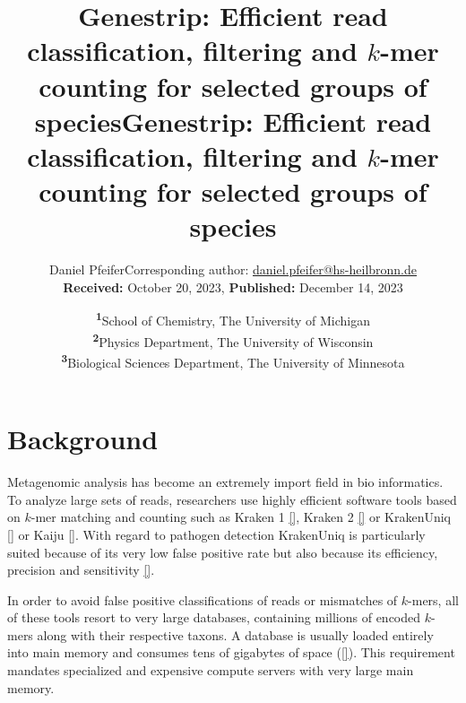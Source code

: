\documentclass[
	a4paper, %
	10pt, %
	unnumberedsections, %
	twoside, %
]{LTJournalArticle}
\title{Genestrip: Efficient read classification, filtering and $k$-mer counting for selected groups of species} %
\author{%
	Daniel Pfeifer{Corresponding author: \href{mailto:daniel.pfeifer@hs-heilbronn.de}{daniel.pfeifer@hs-heilbronn.de}\\ \textbf{Received:} October 20, 2023, \textbf{Published:} December 14, 2023}
}
\date{\footnotesize\textsuperscript{\textbf{1}}School of Chemistry, The University of Michigan\\ \textsuperscript{\textbf{2}}Physics Department, The University of Wisconsin\\ \textsuperscript{\textbf{3}}Biological Sciences Department, The University of Minnesota}
\begin{document}
\title[]{Genestrip: Efficient read classification, filtering and $k$-mer counting for selected groups of species}


\author*[1]{ }


\abstract{}




\maketitle

\section{Background}\label{background}

Metagenomic analysis has become an extremely import field in bio informatics. To analyze large sets of reads, researchers use highly efficient software tools based on $k$-mer matching and counting such as Kraken 1 \ref{}, Kraken 2 \ref{} or KrakenUniq \ref{} or Kaiju \ref{}. With regard to pathogen detection KrakenUniq is particularly suited because of its very low false positive rate but also because its efficiency, precision and sensitivity \ref{}.

In order to avoid false positive classifications of reads or mismatches of $k$-mers, all of these tools resort to very large databases, containing millions of encoded $k$-mers along with their respective taxons. A database is usually loaded entirely into main memory and consumes tens of gigabytes of space (\ref{}). This requirement mandates specialized and expensive compute servers with very large main memory.
\end{document}
